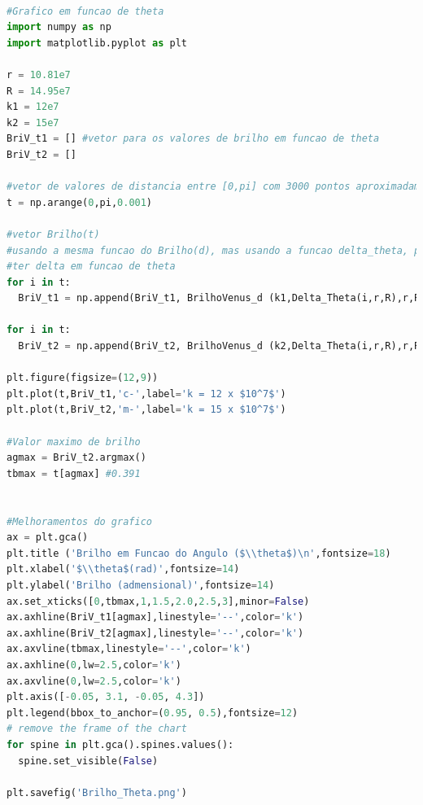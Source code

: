 \documentclass[a4paper, 12pt]{article}
\begin{document}
\begin{lstlisting}[language=Python, caption=Gráfico Brilho de Vênus ($\theta$), label=listing_grafico_B(theta)] 

#Grafico em funcao de theta
import numpy as np
import matplotlib.pyplot as plt

r = 10.81e7
R = 14.95e7
k1 = 12e7
k2 = 15e7
BriV_t1 = [] #vetor para os valores de brilho em funcao de theta 
BriV_t2 = []

#vetor de valores de distancia entre [0,pi] com 3000 pontos aproximadamente
t = np.arange(0,pi,0.001)

#vetor Brilho(t)
#usando a mesma funcao do Brilho(d), mas usando a funcao delta_theta, para 
#ter delta em funcao de theta
for i in t:
  BriV_t1 = np.append(BriV_t1, BrilhoVenus_d (k1,Delta_Theta(i,r,R),r,R)) #k = 12e7

for i in t:
  BriV_t2 = np.append(BriV_t2, BrilhoVenus_d (k2,Delta_Theta(i,r,R),r,R)) #k = 15e7

plt.figure(figsize=(12,9))
plt.plot(t,BriV_t1,'c-',label='k = 12 x $10^7$')
plt.plot(t,BriV_t2,'m-',label='k = 15 x $10^7$')

#Valor maximo de brilho
agmax = BriV_t2.argmax()
tbmax = t[agmax] #0.391


#Melhoramentos do grafico
ax = plt.gca()
plt.title ('Brilho em Funcao do Angulo ($\\theta$)\n',fontsize=18)
plt.xlabel('$\\theta$(rad)',fontsize=14)
plt.ylabel('Brilho (admensional)',fontsize=14)
ax.set_xticks([0,tbmax,1,1.5,2.0,2.5,3],minor=False)
ax.axhline(BriV_t1[agmax],linestyle='--',color='k')
ax.axhline(BriV_t2[agmax],linestyle='--',color='k')
ax.axvline(tbmax,linestyle='--',color='k')
ax.axhline(0,lw=2.5,color='k')
ax.axvline(0,lw=2.5,color='k')
plt.axis([-0.05, 3.1, -0.05, 4.3])
plt.legend(bbox_to_anchor=(0.95, 0.5),fontsize=12)
# remove the frame of the chart
for spine in plt.gca().spines.values():
  spine.set_visible(False) 

plt.savefig('Brilho_Theta.png')

\end{lstlisting}
\end{document}

